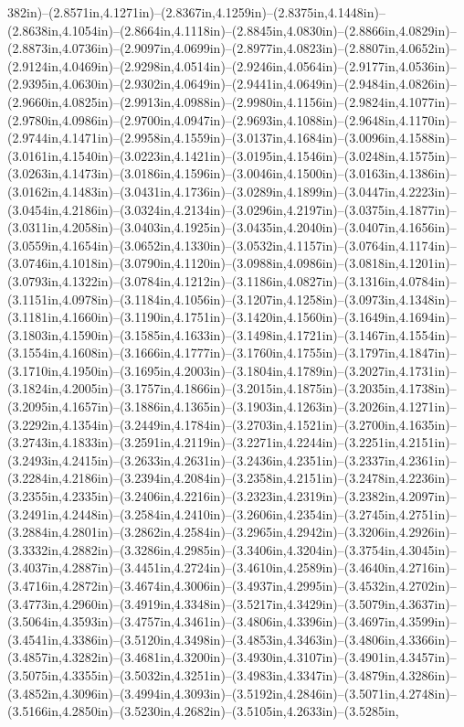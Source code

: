 382in)--(2.8571in,4.1271in)--(2.8367in,4.1259in)--(2.8375in,4.1448in)--(2.8638in,4.1054in)--(2.8664in,4.1118in)--(2.8845in,4.0830in)--(2.8866in,4.0829in)--(2.8873in,4.0736in)--(2.9097in,4.0699in)--(2.8977in,4.0823in)--(2.8807in,4.0652in)--(2.9124in,4.0469in)--(2.9298in,4.0514in)--(2.9246in,4.0564in)--(2.9177in,4.0536in)--(2.9395in,4.0630in)--(2.9302in,4.0649in)--(2.9441in,4.0649in)--(2.9484in,4.0826in)--(2.9660in,4.0825in)--(2.9913in,4.0988in)--(2.9980in,4.1156in)--(2.9824in,4.1077in)--(2.9780in,4.0986in)--(2.9700in,4.0947in)--(2.9693in,4.1088in)--(2.9648in,4.1170in)--(2.9744in,4.1471in)--(2.9958in,4.1559in)--(3.0137in,4.1684in)--(3.0096in,4.1588in)--(3.0161in,4.1540in)--(3.0223in,4.1421in)--(3.0195in,4.1546in)--(3.0248in,4.1575in)--(3.0263in,4.1473in)--(3.0186in,4.1596in)--(3.0046in,4.1500in)--(3.0163in,4.1386in)--(3.0162in,4.1483in)--(3.0431in,4.1736in)--(3.0289in,4.1899in)--(3.0447in,4.2223in)--(3.0454in,4.2186in)--(3.0324in,4.2134in)--(3.0296in,4.2197in)--(3.0375in,4.1877in)--(3.0311in,4.2058in)--(3.0403in,4.1925in)--(3.0435in,4.2040in)--(3.0407in,4.1656in)--(3.0559in,4.1654in)--(3.0652in,4.1330in)--(3.0532in,4.1157in)--(3.0764in,4.1174in)--(3.0746in,4.1018in)--(3.0790in,4.1120in)--(3.0988in,4.0986in)--(3.0818in,4.1201in)--(3.0793in,4.1322in)--(3.0784in,4.1212in)--(3.1186in,4.0827in)--(3.1316in,4.0784in)--(3.1151in,4.0978in)--(3.1184in,4.1056in)--(3.1207in,4.1258in)--(3.0973in,4.1348in)--(3.1181in,4.1660in)--(3.1190in,4.1751in)--(3.1420in,4.1560in)--(3.1649in,4.1694in)--(3.1803in,4.1590in)--(3.1585in,4.1633in)--(3.1498in,4.1721in)--(3.1467in,4.1554in)--(3.1554in,4.1608in)--(3.1666in,4.1777in)--(3.1760in,4.1755in)--(3.1797in,4.1847in)--(3.1710in,4.1950in)--(3.1695in,4.2003in)--(3.1804in,4.1789in)--(3.2027in,4.1731in)--(3.1824in,4.2005in)--(3.1757in,4.1866in)--(3.2015in,4.1875in)--(3.2035in,4.1738in)--(3.2095in,4.1657in)--(3.1886in,4.1365in)--(3.1903in,4.1263in)--(3.2026in,4.1271in)--(3.2292in,4.1354in)--(3.2449in,4.1784in)--(3.2703in,4.1521in)--(3.2700in,4.1635in)--(3.2743in,4.1833in)--(3.2591in,4.2119in)--(3.2271in,4.2244in)--(3.2251in,4.2151in)--(3.2493in,4.2415in)--(3.2633in,4.2631in)--(3.2436in,4.2351in)--(3.2337in,4.2361in)--(3.2284in,4.2186in)--(3.2394in,4.2084in)--(3.2358in,4.2151in)--(3.2478in,4.2236in)--(3.2355in,4.2335in)--(3.2406in,4.2216in)--(3.2323in,4.2319in)--(3.2382in,4.2097in)--(3.2491in,4.2448in)--(3.2584in,4.2410in)--(3.2606in,4.2354in)--(3.2745in,4.2751in)--(3.2884in,4.2801in)--(3.2862in,4.2584in)--(3.2965in,4.2942in)--(3.3206in,4.2926in)--(3.3332in,4.2882in)--(3.3286in,4.2985in)--(3.3406in,4.3204in)--(3.3754in,4.3045in)--(3.4037in,4.2887in)--(3.4451in,4.2724in)--(3.4610in,4.2589in)--(3.4640in,4.2716in)--(3.4716in,4.2872in)--(3.4674in,4.3006in)--(3.4937in,4.2995in)--(3.4532in,4.2702in)--(3.4773in,4.2960in)--(3.4919in,4.3348in)--(3.5217in,4.3429in)--(3.5079in,4.3637in)--(3.5064in,4.3593in)--(3.4757in,4.3461in)--(3.4806in,4.3396in)--(3.4697in,4.3599in)--(3.4541in,4.3386in)--(3.5120in,4.3498in)--(3.4853in,4.3463in)--(3.4806in,4.3366in)--(3.4857in,4.3282in)--(3.4681in,4.3200in)--(3.4930in,4.3107in)--(3.4901in,4.3457in)--(3.5075in,4.3355in)--(3.5032in,4.3251in)--(3.4983in,4.3347in)--(3.4879in,4.3286in)--(3.4852in,4.3096in)--(3.4994in,4.3093in)--(3.5192in,4.2846in)--(3.5071in,4.2748in)--(3.5166in,4.2850in)--(3.5230in,4.2682in)--(3.5105in,4.2633in)--(3.5285in,